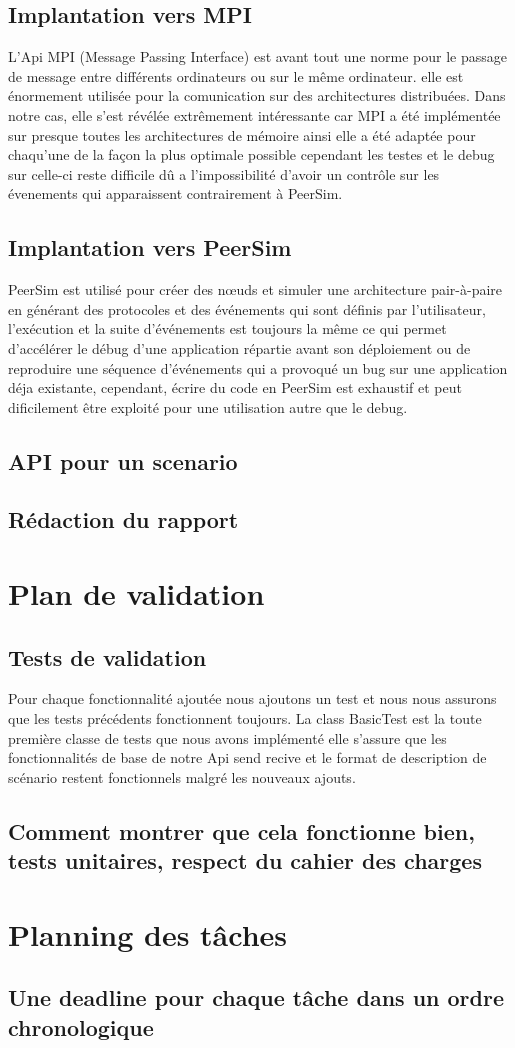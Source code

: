 \documentclass{article}
\begin{document}
			\subsection{Implantation vers MPI}
			L'Api MPI (Message Passing Interface) est avant tout une norme pour le passage de message entre différents ordinateurs ou sur le même ordinateur.
			elle est énormement utilisée pour la comunication sur des architectures distribuées.
			Dans notre cas, elle s'est révélée extrêmement intéressante car MPI a été implémentée sur presque toutes les architectures de mémoire ainsi elle 
			a été adaptée pour chaqu'une de la façon la plus optimale possible cependant les testes et le debug sur celle-ci reste difficile dû a l'impossibilité 
			d'avoir un contrôle sur les évenements qui apparaissent contrairement à PeerSim.
			\subsection{Implantation vers PeerSim}
			PeerSim est utilisé pour créer des nœuds et simuler une architecture pair-à-paire en générant des protocoles et des événements 
			qui sont définis par l'utilisateur, l'exécution et la suite d'événements est toujours la même ce qui permet d'accélérer 
			le débug d'une application répartie avant son déploiement ou de reproduire une séquence d'événements qui a provoqué un bug
			sur une application déja existante, cependant, écrire du code en PeerSim est exhaustif et peut dificilement être exploité pour une utilisation
			autre que le debug.
			\subsection{API pour un scenario}
			\subsection{Rédaction du rapport}

		\section{Plan de validation}
		\subsection{Tests de validation}
		Pour chaque fonctionnalité ajoutée nous ajoutons un test et nous nous assurons que les tests précédents fonctionnent toujours.
		\newline
		La class BasicTest est la toute première classe de tests que nous avons implémenté elle s'assure que les fonctionnalités de base de notre Api
		send recive et le format de description de scénario restent fonctionnels malgré les nouveaux ajouts.
			\subsection{Comment montrer que cela fonctionne bien, tests unitaires, respect du cahier des charges}
		\section{Planning des tâches}
			\subsection{Une deadline pour chaque tâche dans un ordre chronologique}
\end{document}

